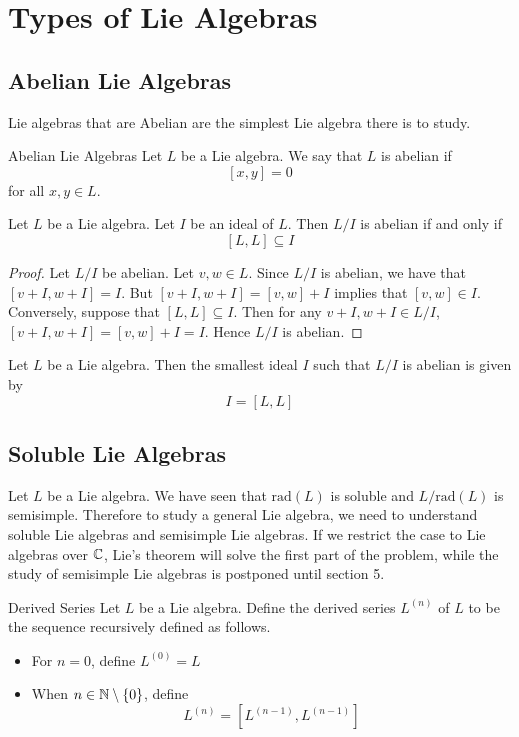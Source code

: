 \documentclass[a4paper]{article}
\begin{document}
\pagebreak
\section{Types of Lie Algebras}
\subsection{Abelian Lie Algebras}
Lie algebras that are Abelian are the simplest Lie algebra there is to study. 

\begin{defn}{Abelian Lie Algebras}{} Let $L$ be a Lie algebra. We say that $L$ is abelian if $$[x,y]=0$$ for all $x,y\in L$. 
\end{defn}

\begin{lmm}{}{} Let $L$ be a Lie algebra. Let $I$ be an ideal of $L$. Then $L/I$ is abelian if and only if $$[L,L]\subseteq I$$ \tcbline
\begin{proof}
Let $L/I$ be abelian. Let $v,w\in L$. Since $L/I$ is abelian, we have that $[v+I,w+I]=I$. But $[v+I,w+I]=[v,w]+I$ implies that $[v,w]\in I$. Conversely, suppose that $[L,L]\subseteq I$. Then for any $v+I,w+I\in L/I$, $[v+I,w+I]=[v,w]+I=I$. Hence $L/I$ is abelian. 
\end{proof}
\end{lmm}

\begin{crl}{}{} Let $L$ be a Lie algebra. Then the smallest ideal $I$ such that $L/I$ is abelian is given by $$I=[L,L]$$
\end{crl}

\subsection{Soluble Lie Algebras}
Let $L$ be a Lie algebra. We have seen that $\text{rad}(L)$ is soluble and $L/\text{rad}(L)$ is semisimple. Therefore to study a general Lie algebra, we need to understand soluble Lie algebras and semisimple Lie algebras. If we restrict the case to Lie algebras over $\mathbb{C}$, Lie's theorem will solve the first part of the problem, while the study of semisimple Lie algebras is postponed until section 5. 

\begin{defn}{Derived Series}{} Let $L$ be a Lie algebra. Define the derived series $L^{(n)}$ of $L$ to be the sequence recursively defined as follows. 
\begin{itemize}
\item For $n=0$, define $L^{(0)}=L$
\item When $n\in\mathbb{N}\setminus\{0\}$, define $$L^{(n)}=[L^{(n-1)},L^{(n-1)}]$$
\end{itemize}
\end{defn}
\end{document}
